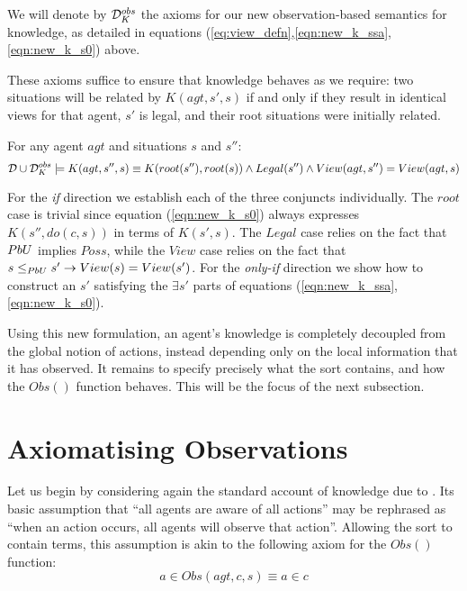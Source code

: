 \begin{defn}
We will denote by $\mathcal{D}_{K}^{obs}$ the axioms for our new observation-based
semantics for knowledge, as detailed in equations (\ref{eq:view_defn},\ref{eqn:new_k_ssa},\ref{eqn:new_k_s0})
above. 
\end{defn}
These axioms suffice to ensure that knowledge behaves as we require:
two situations will be related by $K(agt,s',s)$ if and only if they
result in identical views for that agent, $s'$ is legal, and their
root situations were initially related.

\begin{thm}
\label{thm:k_obs_equiv} For any agent $agt$ and situations $s$
and $s''$:\[
\mathcal{D}\cup\mathcal{D}_{K}^{obs}\models K(agt,s'',s)\equiv K(root(s''),root(s))\wedge Legal(s'')\wedge View(agt,s'')=View(agt,s)\]

\end{thm}
\begin{proofsketch}
For the \emph{if} direction we establish each of the three conjuncts
individually. The $root$ case is trivial since equation (\ref{eqn:new_k_s0})
always expresses $K(s'',do(c,s))$ in terms of $K(s',s)$. The $Legal$
case relies on the fact that $PbU$ implies $Poss$, while the $View$
case relies on the fact that $s\leq_{PbU}s'\rightarrow View(s)=View(s')$.
For the \emph{only-if} direction we show how to construct an $s'$
satisfying the $\exists s'$ parts of equations (\ref{eqn:new_k_ssa},\ref{eqn:new_k_s0}). 
\end{proofsketch}
Using this new formulation, an agent's knowledge is completely decoupled
from the global notion of actions, instead depending only on the local
information that it has observed. It remains to specify precisely
what the  sort contains, and how the $Obs()$ function
behaves. This will be the focus of the next subsection.


\section{Axiomatising Observations}

Let us begin by considering again the standard account of knowledge
due to \citep{scherl03sc_knowledge}. Its basic assumption that {}``all
agents are aware of all actions'' may be rephrased as {}``when an
action occurs, all agents will observe that action''. Allowing the
 sort to contain  terms, this assumption
is akin to the following axiom for the $Obs()$ function:\begin{equation}
a\in Obs(agt,c,s)\equiv a\in c\label{eq:ax_obs_std1}\end{equation}


